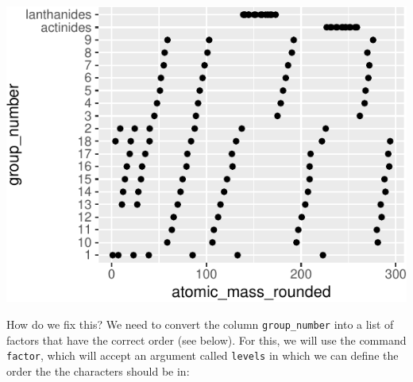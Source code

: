 \documentclass[
]{krantz}
\begin{document}
\begin{center}\includegraphics[width=1\linewidth]{index_files/figure-latex/unnamed-chunk-190-1} \end{center}

How do we fix this? We need to convert the column \texttt{group\_number} into a list of factors that have the correct order (see below). For this, we will use the command \texttt{factor}, which will accept an argument called \texttt{levels} in which we can define the order the the characters should be in:
\end{document}
